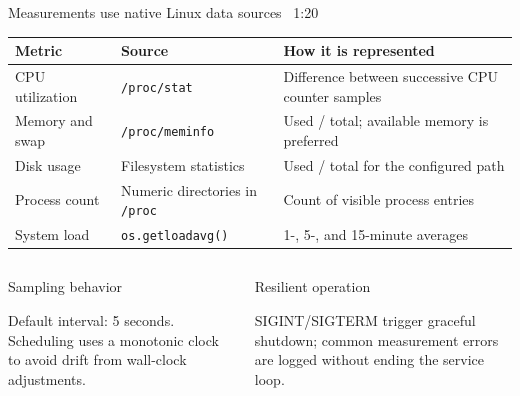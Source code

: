 \documentclass[aspectratio=169,10pt]{beamer}
\newcommand{\slidepace}[1]{\hfill{\scriptsize\color{TBLMuted}#1}}
\begin{document}
\begin{frame}{Measurements use native Linux data sources}
\slidepace{~1:20}
\begin{center}
\begin{tabularx}{\textwidth}{@{}>{\raggedright\arraybackslash}p{}>{\raggedright\arraybackslash}p{}X@{}}
\toprule
\textbf{Metric} & \textbf{Source} & \textbf{How it is represented} \\
\midrule
CPU utilization & \texttt{/proc/stat} & Difference between successive CPU counter samples \\
Memory and swap & \texttt{/proc/meminfo} & Used / total; available memory is preferred \\
Disk usage & Filesystem statistics & Used / total for the configured path \\
Process count & Numeric directories in \texttt{/proc} & Count of visible process entries \\
System load & \texttt{os.getloadavg()} & 1-, 5-, and 15-minute averages \\
\bottomrule
\end{tabularx}
\end{center}
\vspace{0.5em}
\begin{columns}[T,onlytextwidth]
    \begin{block}{Sampling behavior}\raggedright
      Default interval: 5 seconds. Scheduling uses a monotonic clock to avoid drift from wall-clock adjustments.
    \end{block}
    \begin{block}{Resilient operation}\raggedright
      SIGINT/SIGTERM trigger graceful shutdown; common measurement errors are logged without ending the service loop.
    \end{block}
\end{columns}

\end{frame}
\end{document}

